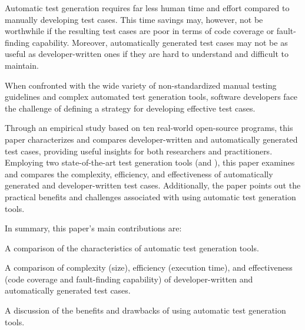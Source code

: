 Automatic test generation requires far less human time and effort compared to
manually developing test cases. This time savings may, however, not be
worthwhile if the resulting test cases are poor in terms of code coverage or
fault-finding capability.  Moreover, automatically generated test cases may not
be as useful as developer-written ones if they are hard to understand and 
difficult to maintain.

When confronted with the wide variety of non-standardized manual testing
guidelines and complex automated test generation tools, software developers face
the challenge of defining a strategy for developing effective test cases.

Through an empirical study based on ten real-world open-source programs, this
paper characterizes and compares developer-written and automatically generated
test cases, providing useful insights for both researchers and practitioners.
%
%
Employing two state-of-the-art test generation tools (\evo and \codepro), this
paper examines and compares the complexity, efficiency, and effectiveness of
automatically generated and developer-written test cases. Additionally, the
paper points out the practical benefits and challenges associated with using
automatic test generation tools.

In summary, this paper's main contributions are:
\squishlist
\item A comparison of the characteristics of automatic test generation tools.

\item A comparison of complexity (size), 
      efficiency (execution time), and 
      effectiveness (code coverage and fault-finding capability) 
      of developer-written and automatically generated test cases.

\item A discussion of the benefits and drawbacks of using automatic test 
      generation tools.
\squishend


